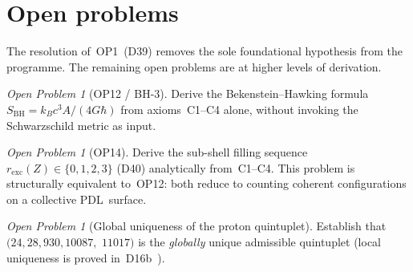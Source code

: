 \documentclass[11pt,a4paper]{article}
\theoremstyle{plain}
\theoremstyle{definition}
\theoremstyle{remark}
\newtheorem{openproblem}[theorem]{Open Problem}
\newcommand{\PDL}{\textnormal{PDL}}
\begin{document}
\section{Open problems}
\label{sec:open}

The resolution of~OP1~(D39) removes the sole foundational hypothesis from the programme. The remaining open problems are at higher levels of derivation.

\begin{openproblem}[OP12 / BH-3]
Derive the Bekenstein--Hawking formula $S_{\mathrm{BH}} = k_B c^3 A / (4G\hbar)$ from axioms~C1--C4 alone, without invoking the Schwarzschild metric as input.
\end{openproblem}

\begin{openproblem}[OP14]
Derive the sub-shell filling sequence $r_{\mathrm{exc}}(Z) \in \{0,1,2,3\}$ (D40) analytically from~C1--C4. This problem is structurally equivalent to~OP12: both reduce to counting coherent configurations on a collective \PDL\ surface.
\end{openproblem}

\begin{openproblem}[Global uniqueness of the proton quintuplet]
Establish that $(24, 28, 930, 10087,$ $11017)$ is the \emph{globally} unique admissible quintuplet (local uniqueness is proved in~D16b~\cite{PDL_D16b_2026}).
\end{openproblem}

\clearpage


\end{document}
